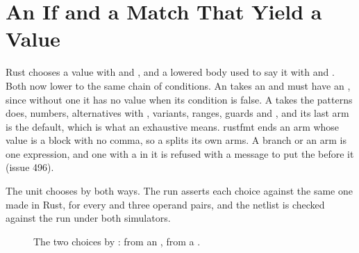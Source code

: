\section{An If and a Match That Yield a Value}
\label{sec:x-valif}

Rust chooses a value with  and , and a lowered
body used to say it with  and . Both now lower
to the same chain of conditions. An  takes an 
and must have an , since without one it has no value when
its condition is false. A  takes the patterns
 does, numbers, alternatives with \code{|}, variants,
ranges, guards and \code{\_}, and its last arm is the default, which
is what an exhaustive  means. rustfmt ends an arm whose
value is a block with no comma, so a  splits its own
arms. A branch or an arm is one expression, and one with a
 in it is refused with a message to put the 
before it (issue 496).

The unit chooses by  both ways. The run asserts each choice
against the same one made in Rust, for every  and three
operand pairs, and the netlist is checked against the run under both
simulators.

\begin{figure}[htbp]
\centering

\caption{The two choices by :  from an
,  from a .}
\label{fig:x-valif}
\end{figure}




